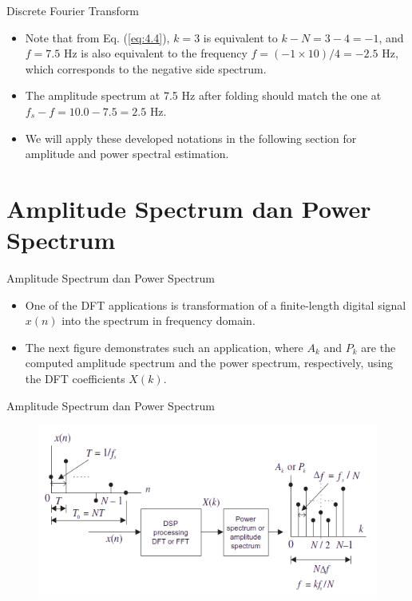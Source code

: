\documentclass[pdflatex,compress,mathserif]{beamer}
\begin{document}
\begin{frame}{Discrete Fourier Transform}
    \begin{itemize}
        \item Note that from Eq. (\ref{eq:4.4}), $k = 3$ is equivalent to $k - N = 3 - 4 = -1$, and $f = 7.5 \text{ Hz}$ is also equivalent to the frequency $f = (-1 \times 10)/4 = -2.5 \text{ Hz}$, which corresponds to the negative side spectrum.
        \item The amplitude spectrum at 7.5 Hz after folding should match the one at $f_s - f = 10.0 - 7.5 = 2.5 \text{ Hz}$.
        \item We will apply these developed notations in the following section for amplitude and power spectral estimation.
    \end{itemize}
\end{frame}

\section{Amplitude Spectrum dan Power Spectrum}

\begin{frame}{Amplitude Spectrum dan Power Spectrum}
    \begin{itemize}
        \item One of the DFT applications is transformation of a finite-length digital signal $x(n)$ into the spectrum in frequency domain.
        \item The next figure demonstrates such an application, where $A_k$ and $P_k$ are the computed amplitude spectrum and the power spectrum, respectively, using the DFT coefficients $X(k)$.
    \end{itemize}
\end{frame}

\begin{frame}{Amplitude Spectrum dan Power Spectrum}
    \begin{figure}
        \includegraphics[width=\linewidth]{fig/fig.4.07}
    \end{figure}
\end{frame}
\end{document}
